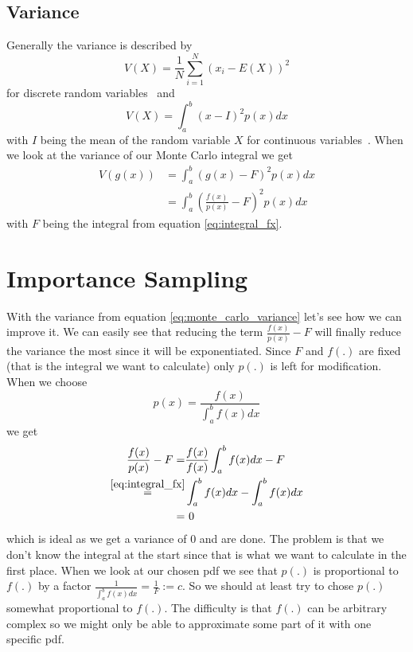 \subsection{Variance}
\label{sec:variance}
Generally the variance is described by $$ V(X) = \frac{1}{N} \sum_{i = 1}^N (x_i - E(X))^2 $$ for discrete random variables~\cite{pris}
and $$ V(X) = \int_{a}^b (x - I)^2 p(x) dx $$ with $ I $ being the mean of the random variable $ X $ for continuous variables~\cite{wyzant}.
When we look at the variance of our Monte Carlo integral we get
\begin{equation}
\label{eq:monte_carlo_variance}
\begin{aligned}
    V(g(x)) &= \int_{a}^b (g(x) - F)^2 p(x) dx \\
            &= \int_{a}^b \left(\frac{f(x)}{p(x)} - F\right)^2 p(x) dx
\end{aligned}
\end{equation}
with $ F $ being the integral from equation \ref{eq:integral_fx}.


\section{Importance Sampling}
\label{sec:importance_sampling}
With the variance from equation \ref{eq:monte_carlo_variance} let's see how we can improve it.
We can easily see that reducing the term $ \frac{f(x)}{p(x)} - F $ will finally reduce the variance the most since it will be exponentiated.
Since $ F $ and $ f(.) $ are fixed (that is the integral we want to calculate) only $ p(.) $ is left for modification.
When we choose $$ p(x) = \frac{f(x)}{\int_{a}^b f(x) dx} $$ we get
\begin{equation}
\label{eq:zero_variance}
\begin{aligned}
    \frac{f(x)}{p(x)} - F =& \frac{f(x)}{f(x)}\int_{a}^b f(x) dx - F \\
    \overset{\ref{eq:integral_fx}}=& \int_{a}^b f(x) dx - \int_{a}^b f(x) dx\\
        =&~0
\end{aligned}
\end{equation}
which is ideal as we get a variance of 0 and are done.
The problem is that we don't know the integral at the start since that is what we want to calculate in the first place.
When we look at our chosen pdf we see that $ p(.) $ is proportional to $ f(.) $ by a factor $ \frac{1}{\int_{a}^b f(x) dx} = \frac{1}{F} := c $.
So we should at least try to chose $ p(.) $ somewhat proportional to $ f(.) $.
The difficulty is that $ f(.) $ can be arbitrary complex so we might only be able to approximate some part of it with one specific pdf.



